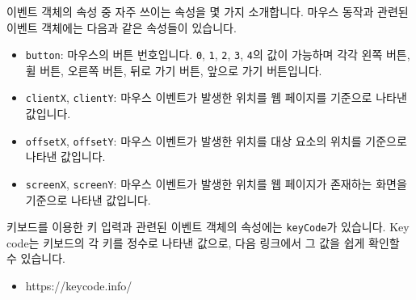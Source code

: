 이벤트 객체의 속성 중 자주 쓰이는 속성을 몇 가지 소개합니다. 마우스 동작과 관련된 이벤트 객체에는 다음과 같은 속성들이 있습니다.

\begin{itemize}
    \item \texttt{button}: 마우스의 버튼 번호입니다. \texttt{0}, \texttt{1}, \texttt{2}, \texttt{3}, \texttt{4}의 값이 가능하며 각각 왼쪽 버튼, 휠 버튼, 오른쪽 버튼, 뒤로 가기 버튼, 앞으로 가기 버튼입니다. 
    \item \texttt{clientX}, \texttt{clientY}: 마우스 이벤트가 발생한 위치를 웹 페이지를 기준으로 나타낸 값입니다. 
    \item \texttt{offsetX}, \texttt{offsetY}: 마우스 이벤트가 발생한 위치를 대상 요소의 위치를 기준으로 나타낸 값입니다. 
    \item \texttt{screenX}, \texttt{screenY}: 마우스 이벤트가 발생한 위치를 웹 페이지가 존재하는 화면을 기준으로 나타낸 값입니다. 
\end{itemize}

키보드를 이용한 키 입력과 관련된 이벤트 객체의 속성에는 \texttt{keyCode}가 있습니다. Key code는 키보드의 각 키를 정수로 나타낸 값으로, 다음 링크에서 그 값을 쉽게 확인할 수 있습니다. 

\begin{itemize}
    \item https://keycode.info/
\end{itemize}
